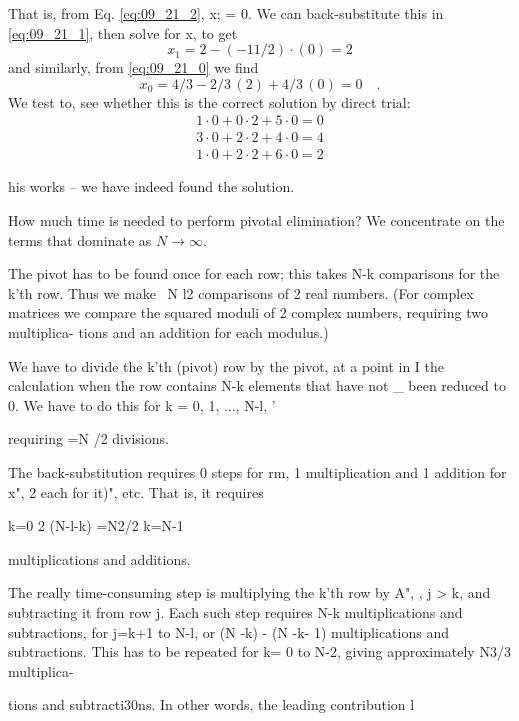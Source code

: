 That is, from Eq. \ref{eq:09_21_2}, x; = 0. We can back-substitute this in  \ref{eq:09_21_1},
then solve for x, to get
\begin{equation*}
    x_1 = 2 - (-11/2)\cdot(0) = 2
\end{equation*} 
and similarly, from \ref{eq:09_21_0} we find
\begin{equation*}
x_0 = 4/3 - 2/3\,(2)+4/3\,(0) = 0 \quad .
\end{equation*} 
We test to, see whether this is the correct solution by direct trial:
\begin{align*}
1 \cdot 0+0 \cdot 2+5 \cdot 0=0\\
3 \cdot 0+2 \cdot 2+4 \cdot 0=4\\
1 \cdot 0+2 \cdot 2+6 \cdot 0=2
\end{align*} 

his works -- we have indeed found the solution.


How much time is needed to perform pivotal elimination? We
concentrate on the terms that dominate as $N\to\infty$.

The pivot has to be found once for each row; this takes N-k
comparisons for the k'th row. Thus we make ~N l2 comparisons
of 2 real numbers. (For complex matrices we compare the
squared moduli of 2 complex numbers, requiring two multiplica-
tions and an addition for each modulus.)

We have to divide the k'th (pivot) row by the pivot, at a point in I
the calculation when the row contains N-k elements that have not \_
been reduced to 0. We have to do this for k = 0, 1, ..., N-l, '

requiring =N /2 divisions.

The back-substitution requires 0 steps for rm, 1 multiplication
and 1 addition for x", 2 each for it)", etc. That is, it requires

k=0
2 (N-l-k) =N2/2
k=N-1

multiplications and additions.

The really time-consuming step is multiplying the k'th row by
A", , j > k, and subtracting it from row j. Each such step requires
N-k multiplications and subtractions, for j=k+1 to N-l, or
(N -k) - (N -k- 1) multiplications and subtractions. This has to be
repeated for k= 0 to N-2, giving approximately N3/3 multiplica-

 


 

tions and subtracti30ns. In other words, the leading contribution l

